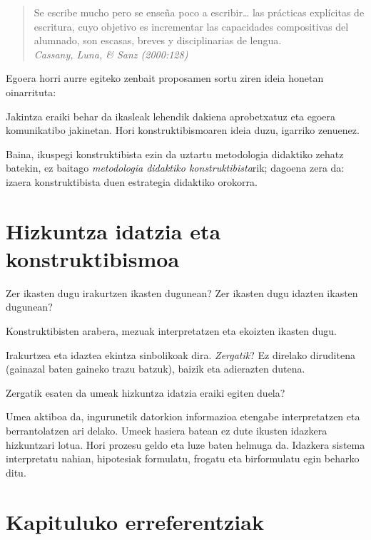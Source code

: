 \documentclass[
]{book}
\begin{document}
\begin{quote}
Se escribe mucho pero se enseña poco a escribir\ldots{} las prácticas explícitas de escritura, cuyo objetivo es incrementar las capacidades compositivas del alumnado, son escasas, breves y disciplinarias de lengua.\\
\emph{Cassany, Luna, \& Sanz (2000:128)}
\end{quote}

Egoera horri aurre egiteko zenbait proposamen sortu ziren ideia honetan oinarrituta:

Jakintza eraiki behar da ikasleak lehendik dakiena aprobetxatuz eta egoera komunikatibo jakinetan. Hori konstruktibismoaren ideia duzu, igarriko zenuenez.

Baina, ikuspegi konstruktibista ezin da uztartu metodologia didaktiko zehatz batekin, ez baitago \emph{metodologia didaktiko konstruktibista}rik; dagoena zera da: izaera konstruktibista duen estrategia didaktiko orokorra.

\hypertarget{hizkuntza-idatzia-eta-konstruktibismoa}{%
\section{Hizkuntza idatzia eta konstruktibismoa}\label{hizkuntza-idatzia-eta-konstruktibismoa}}

Zer ikasten dugu irakurtzen ikasten dugunean? Zer ikasten dugu idazten ikasten dugunean?

Konstruktibisten arabera, mezuak interpretatzen eta ekoizten ikasten dugu.

Irakurtzea eta idaztea ekintza sinbolikoak dira. \emph{Zergatik}? Ez direlako diruditena (gainazal baten gaineko trazu batzuk), baizik eta adierazten dutena.

Zergatik esaten da umeak hizkuntza idatzia eraiki egiten duela?

Umea aktiboa da, ingurunetik datorkion informazioa etengabe
interpretatzen eta berrantolatzen ari delako. Umeek hasiera batean ez dute ikusten idazkera hizkuntzari lotua. Hori prozesu geldo eta luze baten helmuga da.
Idazkera sistema interpretatu nahian, hipotesiak formulatu, frogatu eta birformulatu egin beharko ditu.

\hypertarget{kapituluko-erreferentziak}{%
\section{Kapituluko erreferentziak}\label{kapituluko-erreferentziak}}
\end{document}
